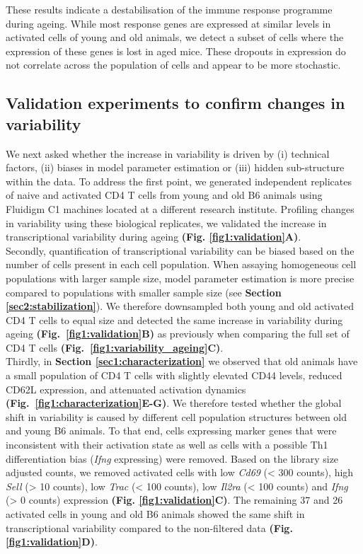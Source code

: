 \newpage

These results indicate a destabilisation of the immune response programme during ageing. 
While most response genes are expressed at similar levels in activated cells of young and old animals, we detect a subset of cells where the expression of these genes is lost in aged mice. 
These dropouts in expression do not correlate across the population of cells and appear to be more stochastic. 

\subsection{Validation experiments to confirm changes in variability}

We next asked whether the increase in variability is driven by (i) technical factors, (ii) biases in model parameter estimation or (iii) hidden sub-structure within the data. 
To address the first point, we generated independent replicates of naive and activated CD4\plus{} T cells from young and old B6 animals using Fluidigm C1 machines located at a different research institute. 
Profiling changes in variability using these biological replicates, we validated the increase in transcriptional variability during ageing \textbf{(Fig. \ref{fig1:validation}A)}.\\

Secondly, quantification of transcriptional variability can be biased based on the number of cells present in each cell population. 
When assaying homogeneous cell populations with larger sample size, model parameter estimation is more precise compared to populations with smaller sample size (see \textbf{Section \ref{sec2:stabilization}}). 
We therefore downsampled both young and old activated CD4\plus{} T cells to equal size and detected the same increase in variability during ageing \textbf{(Fig.~\ref{fig1:validation}B)} as previously when comparing the full set of CD4\plus{} T cells \textbf{(Fig.~\ref{fig1:variability_ageing}C)}. \\

Thirdly, in \textbf{Section \ref{sec1:characterization}} we observed that old animals have a small population of CD4\plus{} T cells with slightly elevated CD44 levels, reduced CD62L expression, and attenuated activation dynamics \textbf{(Fig.~\ref{fig1:characterization}E-G)}. 
We therefore tested whether the global shift in variability is caused by different cell population structures between old and young B6 animals. 
To that end, cells expressing marker genes that were inconsistent with their activation state as well as cells with a possible Th1 differentiation bias (\textit{Ifng} expressing) were removed. 
Based on the library size adjusted counts, we removed activated cells with low \textit{Cd69} (< 300 counts), high \textit{Sell} (> 10 counts), low \textit{Trac} (< 100 counts), low \textit{Il2ra} (< 100 counts) and \textit{Ifng} (> 0 counts) expression \textbf{(Fig. \ref{fig1:validation}C)}. 
The remaining 37 and 26 activated cells in young and old B6 animals showed the same shift in transcriptional variability compared to the non-filtered data \textbf{(Fig. \ref{fig1:validation}D)}. 

